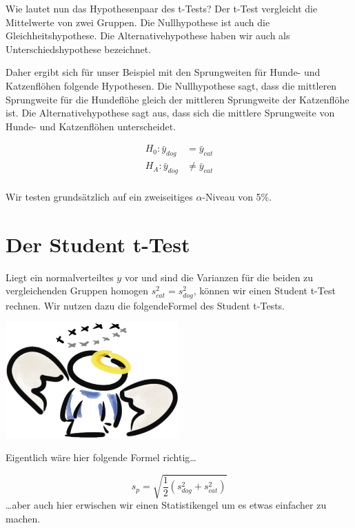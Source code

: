 \documentclass[
  letterpaper,
]{scrbook}
\begin{document}
Wie lautet nun das Hypothesenpaar des t-Tests? Der t-Test vergleicht die
Mittelwerte von zwei Gruppen. Die Nullhypothese ist auch die
Gleichheitshypothese. Die Alternativehypothese haben wir auch als
Unterschiedshypothese bezeichnet.

Daher ergibt sich für unser Beispiel mit den Sprungweiten für Hunde- und
Katzenflöhen folgende Hypothesen. Die Nullhypothese sagt, dass die
mittleren Sprungweite für die Hundeflöhe gleich der mittleren
Sprungweite der Katzenflöhe ist. Die Alternativehypothese sagt aus, dass
sich die mittlere Sprungweite von Hunde- und Katzenflöhen unterscheidet.

\[
\begin{align*} 
H_0: \bar{y}_{dog} &= \bar{y}_{cat} \\  
H_A: \bar{y}_{dog} &\neq \bar{y}_{cat} \\   
\end{align*}
\]

Wir testen grundsätzlich auf ein zweiseitiges \(\alpha\)-Niveau von 5\%.

\hypertarget{der-student-t-test}{%
\section{Der Student t-Test}\label{der-student-t-test}}

Liegt ein normalverteiltes \(y\) vor und sind die Varianzen für die
beiden zu vergleichenden Gruppen homogen \(s^2_{cat} = s^2_{dog}\),
können wir einen Student t-Test rechnen. Wir nutzen dazu die
folgendeFormel des Student t-Tests.

\begin{marginfigure}

{\centering \includegraphics[width=0.5\textwidth,height=\textheight]{./images/angel_01.png}

}

\end{marginfigure}

Eigentlich wäre hier folgende Formel richtig\ldots{}

\[
s_{p} = \sqrt{\frac{1}{2} (s^2_{dog} + s^2_{cat})}
\] \ldots aber auch hier erwischen wir einen Statistikengel um es etwas
einfacher zu machen.
\end{document}
